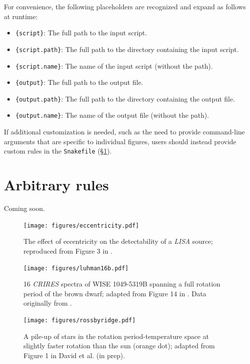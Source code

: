 \documentclass[twocolumn]{aastex631}
\begin{document}
For convenience, the following placeholders are recognized and expand as follows at runtime:
%
\begin{itemize}
\item \texttt{\{script\}}: The full path to the input script.
\item \texttt{\{script.path\}}: The full path to the directory containing the input script.
\item \texttt{\{script.name\}}: The name of the input script (without the path).
\item \texttt{\{output\}}: The full path to the output file.
\item \texttt{\{output.path\}}: The full path to the directory containing the output file.
\item \texttt{\{output.name\}}: The name of the output file (without the path).
\end{itemize}
%
If additional customization is needed, such as the need to provide command-line arguments that are specific to individual figures, users should instead provide custom rules in the \texttt{Snakefile} (\S\ref{sec:arbitrary-rules}).

\section{Arbitrary rules}
\label{sec:arbitrary-rules}
%
Coming soon.

\begin{figure}[ht!]
    \begin{centering}
        \texttt{[image: figures/eccentricity.pdf]}
        \caption{
            The effect of eccentricity on the detectability of a \emph{LISA} source; reproduced from Figure 3 in \citet{Wagg2021}.
        }
        \label{fig:eccentricity}
    \end{centering}
\end{figure}

\begin{figure}[ht!]
    \begin{centering}
        \texttt{[image: figures/luhman16b.pdf]}
        \caption{
            16 \emph{CRIRES} spectra of WISE 1049-5319B spanning a full rotation period of the brown dwarf; adapted from Figure 14 in \citet{Luger2021}. 
            Data originally from \citet{Crossfield2014}.
        }
        \label{fig:luhman16b}
    \end{centering}
\end{figure}

\begin{figure}[ht!]
    \begin{centering}
        \texttt{[image: figures/rossbyridge.pdf]}
        \caption{
            A pile-up of stars in the rotation period-temperature space at slightly faster rotation than the sun (orange dot); adapted from Figure 1 in David et al. (in prep).
        }
        \label{fig:rossbyridge}
    \end{centering}
\end{figure}
\end{document}
